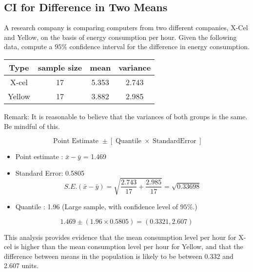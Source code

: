 \documentclass[a4paper,12pt]{article}
\begin{document}
\subsection*{CI for Difference in Two Means}
A research company is comparing computers from two different companies, X-Cel and Yellow, on the basis of energy consumption per hour. Given the following data, compute a $95\%$ confidence interval for the difference in energy consumption.
\begin{center}
\begin{tabular}{|c|c|c|c|}
\hline
Type & sample size & mean & variance \\ \hline
X-cel & 17 & 5.353 & 2.743 \\ \hline
Yellow & 17 & 3.882 & 2.985 \\ \hline
\end{tabular}
\end{center}
Remark: It is reasonable to believe that the variances of both groups is the same. Be mindful of this.
\begin{framed}

\[
\scriptstyle \mbox{ Point Estimate } \pm  \left[ \operatorname{ Quantile } \times \operatorname{Standard Error } 
\right] 
\]

\end{framed}


\begin{itemize}
\item Point estimate : $\bar{x} - \bar{y}$ = 1.469
\item Standard Error: 0.5805
\[ S.E.(\bar{x}-\bar{y}) = \sqrt{\frac{2.743}{17} + \frac{2.985}{17}} = \sqrt{0.33698} \]
\item Quantile : 1.96 (Large sample, with confidence level of $95\%$.)
\end{itemize}

\[ 1.469  \pm (1.96 \times 0.5805) = (0.3321,2.607) \]


This analysis provides evidence that the mean consumption level per hour for X-cel is higher than the mean consumption level per hour for Yellow, and that the difference between means in the population is likely to be between 0.332 and 2.607 units.
\end{document}
